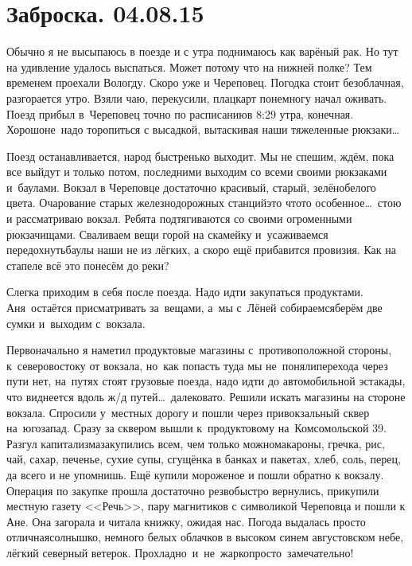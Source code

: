 \chapter{Заброска. 04.08.15}

Обычно я не высыпаюсь в поезде и с утра поднимаюсь как варёный рак. Но тут на удивление удалось выспаться. Может потому что на нижней полке? Тем временем проехали Вологду. Скоро уже и Череповец. Погодка стоит безоблачная, разгорается утро. Взяли чаю, перекусили, плацкарт понемногу начал оживать. Поезд прибыл в~Череповец точно по расписанию\mdash в 8:29 утра, конечная. Хорошо\mdash не~надо торопиться с высадкой, вытаскивая наши тяжеленные рюкзаки\ldots~
 
Поезд останавливается, народ быстренько выходит. Мы не спешим, ждём, пока все выйдут и только потом, последними выходим со всеми своими рюкзаками и~баулами. Вокзал в Череповце достаточно красивый, старый, зелёно\sdash белого цвета. Очарование старых железнодорожных станций\mdash это что\sdash то особенное\ldots~стою и рассматриваю вокзал. Ребята подтягиваются со своими огроменными рюкзачищами. Сваливаем вещи горой на скамейку и~усаживаемся передохнуть\mdash баулы наши не из лёгких, а скоро ещё прибавится провизия. Как на стапеле всё это понесём до реки? 

Слегка приходим в себя после поезда. Надо идти закупаться продуктами. Аня~остаётся присматривать за~вещами, а~мы с~Лёней собираемся\mdash берём две сумки и~выходим с~вокзала. 

Первоначально я наметил продуктовые магазины с~противоположной стороны, к~северо\sdash востоку от вокзала, но~как попасть туда мы не~поняли\mdash перехода через пути нет, на~путях стоят грузовые поезда, надо идти до автомобильной эстакады, что виднеется вдоль ж/д путей\ldots~далековато. Решили искать магазины на стороне вокзала. Спросили у~местных дорогу и пошли через привокзальный сквер на~юго\sdash запад. Сразу за сквером вышли к~продуктовому на~Комсомольской 39. Разгул капитализма\mdash закупились всем, чем только можно\mdash макароны, гречка, рис, чай, сахар, печенье, сухие супы, сгущёнка в банках и пакетах, хлеб, соль, перец, да всего и не упомнишь. Ещё купили мороженое и пошли обратно к вокзалу. Операция по закупке прошла достаточно резво\mdash быстро вернулись, прикупили местную газету <<Речь>>, пару магнитиков с символикой Череповца и пошли к Ане. Она загорала и читала книжку, ожидая нас. Погода выдалась просто отличная\mdash солнышко, немного белых облачков в высоком синем августовском небе, лёгкий северный ветерок. Прохладно~и~не~жарко\mdash просто~замечательно! 

